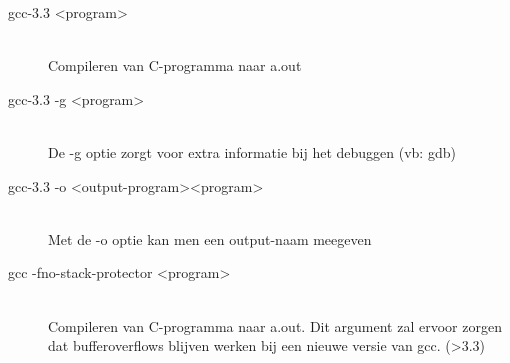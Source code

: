 \begin{description}
  \item[gcc-3.3 \textless program\textgreater] \hfill \\
  Compileren van C-programma naar a.out
  \item[gcc-3.3 -g \textless program\textgreater] \hfill \\
  De -g optie zorgt voor extra informatie bij het debuggen (vb: gdb)
  \item[gcc-3.3 -o \textless output-program\textgreater \textless program\textgreater] \hfill \\
  Met de -o optie kan men een output-naam meegeven
  \item[gcc -fno-stack-protector \textless program\textgreater] \hfill \\
  Compileren van C-programma naar a.out. Dit argument zal ervoor zorgen dat bufferoverflows blijven werken bij een nieuwe versie van gcc. (\textgreater 3.3) 
\end{description}